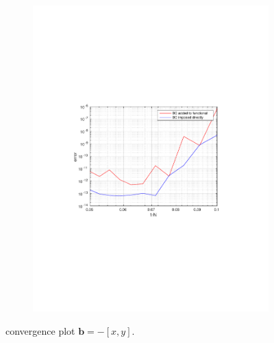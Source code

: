 \begin{figure}[h!]
\begin{subfigure}[b]{0.48\textwidth}
		\includegraphics[width=\textwidth]{Figures/Spec-LS_difftrans_Convergence.pdf}
  \end{subfigure}
  \vspace{-0.1\baselineskip}
	\caption{convergence plot  $\mathbf{b} = -[x,y]$.}
  \label{fig:ConvergenceDifftransSpec}
\end{figure}
%


